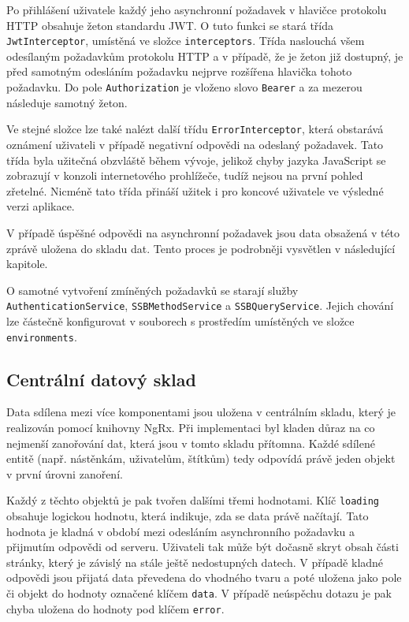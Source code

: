 Po přihlášení uživatele každý jeho asynchronní požadavek v hlavičce protokolu HTTP obsahuje žeton standardu JWT. O tuto funkci se stará třída \texttt{JwtInterceptor}, umístěná ve složce \texttt{interceptors}. Třída naslouchá všem odesílaným požadavkům protokolu HTTP a v případě, že je žeton již dostupný, je před samotným odesláním požadavku nejprve rozšířena hlavička tohoto požadavku. Do pole \texttt{Authorization} je vloženo slovo \texttt{Bearer} a za mezerou následuje samotný žeton.

Ve stejné složce lze také nalézt další třídu \texttt{ErrorInterceptor}, která obstarává oznámení uživateli v případě negativní odpovědi na odeslaný požadavek. Tato třída byla užitečná obzvláště během vývoje, jelikož chyby jazyka JavaScript se zobrazují v konzoli internetového prohlížeče, tudíž nejsou na první pohled zřetelné. Nicméně tato třída přináší užitek i pro koncové uživatele ve výsledné verzi aplikace.

V případě úspěšné odpovědi na asynchronní požadavek jsou data obsažená v této zprávě uložena do skladu dat. Tento proces je podrobněji vysvětlen v následující kapitole.

O samotné vytvoření zmíněných požadavků se starají služby \texttt{AuthenticationService}, \texttt{SSBMethodService} a \texttt{SSBQueryService}. Jejich chování lze částečně konfigurovat v souborech s prostředím umístěných ve složce \texttt{environments}.


\subsection{Centrální datový sklad}
Data sdílena mezi více komponentami jsou uložena v centrálním skladu, který je realizován pomocí knihovny NgRx. Při implementaci byl kladen důraz na co nejmenší zanořování dat, která jsou v tomto skladu přítomna. Každé sdílené entitě (např. nástěnkám, uživatelům, štítkům) tedy odpovídá právě jeden objekt v první úrovni zanoření.

Každý z těchto objektů je pak tvořen dalšími třemi hodnotami. Klíč \texttt{loading} obsahuje logickou hodnotu, která indikuje, zda se data právě načítají. Tato hodnota je kladná v období mezi odesláním asynchronního požadavku a přijmutím odpovědi od serveru. Uživateli tak může být dočasně skryt obsah části stránky, který je závislý na stále ještě nedostupných datech. V případě kladné odpovědi jsou přijatá data převedena do vhodného tvaru a poté uložena jako pole či objekt do hodnoty označené klíčem \texttt{data}. V případě neúspěchu dotazu je pak chyba uložena do hodnoty pod klíčem \texttt{error}.

